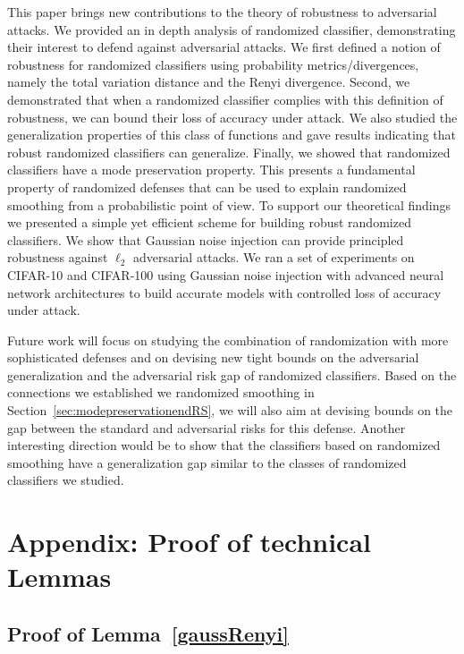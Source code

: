 This paper brings new contributions to the theory of robustness to adversarial attacks. We provided an in depth analysis of randomized classifier, demonstrating their interest to defend against adversarial attacks. We first defined a notion of robustness for randomized classifiers using probability metrics/divergences, namely the total variation distance and the Renyi divergence. Second, we demonstrated that when a randomized classifier complies with this definition of robustness, we can bound their loss of accuracy under attack. We also studied the generalization properties of this class of functions and gave results indicating that robust randomized classifiers can generalize. Finally, we showed that randomized classifiers have a mode preservation property. This presents a fundamental property of randomized defenses that can be used to explain randomized smoothing from a probabilistic point of view.
To support our theoretical findings we presented a simple yet efficient scheme for building robust randomized classifiers. We show that Gaussian noise injection can provide principled robustness against $\ell_2$ adversarial attacks. We ran a set of experiments on CIFAR-10 and CIFAR-100 using Gaussian noise injection with advanced neural network architectures to build accurate models with controlled loss of accuracy under attack.

Future work will focus on studying the combination of randomization with more sophisticated defenses and on devising new tight bounds on the adversarial generalization and the adversarial risk gap of randomized classifiers. Based on the connections we established we randomized smoothing in Section~\ref{sec:modepreservationendRS}, we will also aim at devising bounds on the gap between the standard and adversarial risks for this defense. Another interesting direction would be to show that the classifiers based on randomized smoothing have a generalization gap similar to the classes of randomized classifiers we studied. 


\section{Appendix: Proof of technical Lemmas}

\subsection{Proof of Lemma~\ref{gaussRenyi}}


